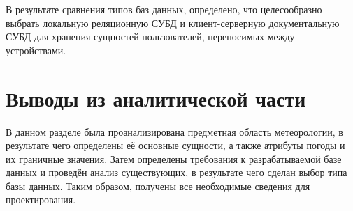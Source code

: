В результате сравнения типов баз данных, определено, что целесообразно выбрать локальную реляционную СУБД и клиент-серверную документальную СУБД для хранения сущностей пользователей, переносимых между устройствами.

\section*{Выводы из аналитической части}
В данном разделе была проанализирована предметная область метеорологии, в результате чего определены её основные сущности, а также атрибуты погоды и их граничные значения.
Затем определены требования к разрабатываемой базе данных и проведён анализ существующих, в результате чего сделан выбор типа базы данных.
Таким образом, получены все необходимые сведения для проектирования.